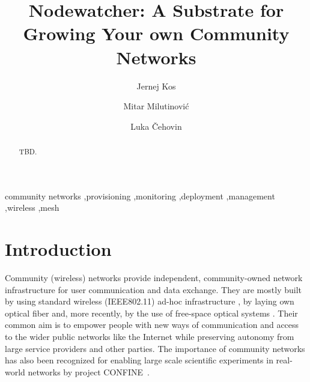 \documentclass[5p,sort&compress]{elsarticle}
\begin{document}
\begin{frontmatter}
\title{Nodewatcher: A Substrate for Growing Your own Community Networks}

\author[fri,wlansi]{Jernej Kos}

\author[berkeley,wlansi]{Mitar Milutinović}

\author[fri,wlansi]{Luka Čehovin}


\address[fri]{University of Ljubljana, Faculty of Computer and Information Science, Ljubljana, Slovenia}

\address[berkeley]{University of California, Berkeley, USA}

\address[wlansi]{wlan slovenia, Open wireless network of Slovenia, \url{https://wlan-si.net}}

\begin{abstract}
TBD.
\end{abstract}

\begin{keyword}
community networks \sep provisioning \sep monitoring \sep deployment \sep management \sep wireless \sep mesh
\end{keyword}
\end{frontmatter}

\section{Introduction}

Community (wireless) networks \cite{Bruno_2005} provide independent, community-owned network infrastructure for user communication and data exchange. They are mostly built by using standard wireless (IEEE802.11) ad-hoc infrastructure \cite{Akyildiz_2005}, by laying own optical fiber and, more recently, by the use of free-space optical systems \cite{Mustafa_2013}. Their common aim is to empower people with new ways of communication and access to the wider public networks like the Internet while preserving autonomy from large service providers and other parties. The importance of community networks has also been recognized for enabling large scale scientific experiments in real-world networks by project CONFINE~\cite{Braem_2013}.
\end{document}
